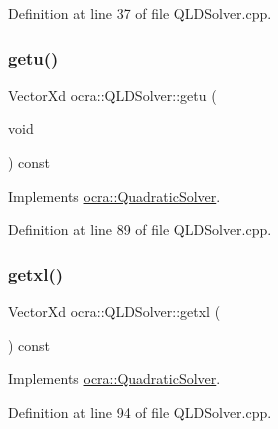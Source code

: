 Definition at line 37 of file Q\+L\+D\+Solver.\+cpp.

\hypertarget{classocra_1_1QLDSolver_a643f978628ee45f88940ddbd7822aedd}{}\label{classocra_1_1QLDSolver_a643f978628ee45f88940ddbd7822aedd} 
\subsubsection{\texorpdfstring{getu()}{getu()}}
{\footnotesize\ttfamily Vector\+Xd ocra\+::\+Q\+L\+D\+Solver\+::getu (\begin{DoxyParamCaption}\item[{void}]{ }\end{DoxyParamCaption}) const\hspace{0.3cm}{\ttfamily [virtual]}}



Implements \hyperlink{classocra_1_1QuadraticSolver_a6d5040842f155042064a33939aa60385}{ocra\+::\+Quadratic\+Solver}.



Definition at line 89 of file Q\+L\+D\+Solver.\+cpp.

\hypertarget{classocra_1_1QLDSolver_ab0ad9b36f9a063b0fb59d48e447a1449}{}\label{classocra_1_1QLDSolver_ab0ad9b36f9a063b0fb59d48e447a1449} 
\subsubsection{\texorpdfstring{getxl()}{getxl()}}
{\footnotesize\ttfamily Vector\+Xd ocra\+::\+Q\+L\+D\+Solver\+::getxl (\begin{DoxyParamCaption}{ }\end{DoxyParamCaption}) const\hspace{0.3cm}{\ttfamily [virtual]}}



Implements \hyperlink{classocra_1_1QuadraticSolver_a9c8270a0e1a921641884586ff448392b}{ocra\+::\+Quadratic\+Solver}.



Definition at line 94 of file Q\+L\+D\+Solver.\+cpp.

\hypertarget{classocra_1_1QLDSolver_a59bf1fba85f791bc1c30521373fcb999}{}\label{classocra_1_1QLDSolver_a59bf1fba85f791bc1c30521373fcb999} 
